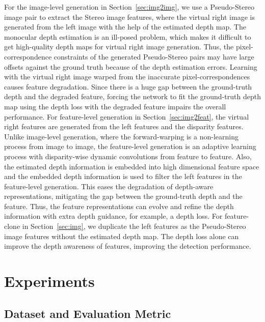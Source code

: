 \documentclass[10pt,twocolumn,letterpaper]{article}
\begin{document}
For the image-level generation in Section~\ref{sec:img2img}, we use a Pseudo-Stereo image pair to extract the Stereo image features, where the virtual right image is generated from the left image with the help of the estimated depth map. The monocular depth estimation is an ill-posed problem, which makes it difficult to get high-quality depth maps for virtual right image generation.
Thus, the pixel-correspondence constraints of the generated Pseudo-Stereo pairs may have large offsets against the ground truth because of the depth estimation errors.
Learning with the virtual right image warped from the inaccurate pixel-correspondences causes feature degradation. Since there is a huge gap between the ground-truth depth and the degraded feature, forcing the network to fit the ground-truth depth map using the depth loss with the degraded feature impairs the overall performance. For feature-level generation in Section~\ref{sec:img2feat}, the virtual right features are generated from the left features and the disparity features. Unlike image-level generation, where the forward-warping is a non-learning process from image to image, the feature-level generation is an adaptive learning process with disparity-wise dynamic convolutions from feature to feature. Also, the estimated depth information is embedded into high dimensional feature space and the embedded depth information is used to filter the left features in the feature-level generation. This eases the degradation of depth-aware representations, mitigating the gap between the ground-truth depth and the feature. Thus, the feature representations can evolve and refine the depth information with extra depth guidance, for example, a depth loss. For feature-clone in Section~\ref{sec:img}, we duplicate the left features as the Pseudo-Stereo image features without the estimated depth map. The depth loss alone can improve the depth awareness of features, improving the detection performance.


\section{Experiments}

\subsection{Dataset and Evaluation Metric}
\end{document}
